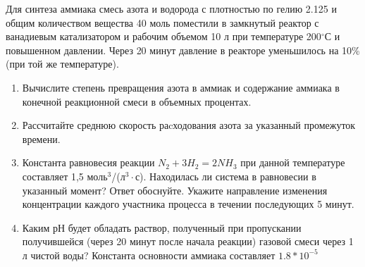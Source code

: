 
Для синтеза аммиака смесь азота и водорода с плотностью по гелию 2.125 и общим количеством вещества 40 моль 
поместили в замкнутый реактор с ванадиевым катализатором и рабочим объемом 10 л при температуре 200$^{\circ}$С и 
повышенном давлении. Через 20 минут давление в реакторе уменьшилось на 10\% (при той же температуре). 

\begin{enumerate}
    \item Вычислите степень превращения азота в аммиак и содержание аммиака в конечной реакционной смеси в 
    объемных процентах.
    \item Рассчитайте среднюю скорость раcходования азота за указанный промежуток времени.
    \item Константа равновесия реакции $N_2 + 3H_2 = 2NH_3$ при данной температуре составляет 1,5 моль$^3$/(л$^3 \cdot$с). 
    Находилась ли система в равновесии в указанный момент? Ответ обоснуйте. Укажите направление изменения 
    концентрации каждого участника процесса в течении последующих 5 минут. 
    \item Каким рН будет обладать раствор, полученный при пропускании получившейся (через 20 минут 
    после начала реакции) газовой смеси через 1 л чистой воды? Константа основности аммиака составляет $1.8*10^{-5}$    
\end{enumerate}